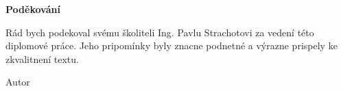 \documentclass[a4paper,12pt]{report}	%
\begin{document}
{\bf Poděkování}

\vspace{5mm} %

Rád bych podekoval svému školiteli Ing. Pavlu Strachotovi za vedení této diplomové práce. Jeho pripomínky byly znacne podnetné a výrazne prispely ke zkvalitnení textu.

\begin{flushright}
Autor
\end{flushright}


















\nocite{*}				%

\end{document}
